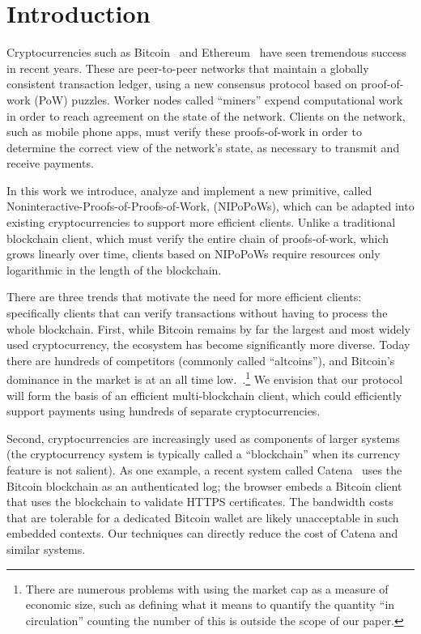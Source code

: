 \section{Introduction}
Cryptocurrencies such as Bitcoin~\cite{bitcoin} and Ethereum~\cite{ethereum} have seen tremendous success in recent years.
These are peer-to-peer networks that maintain a globally consistent transaction ledger, using a new consensus protocol based on proof-of-work (PoW) puzzles. Worker nodes called ``miners'' expend computational work in order to reach agreement on the state of the network.
Clients on the network, such as mobile phone apps, must verify these proofs-of-work in order to determine the correct view of the network's state, as necessary to transmit and receive payments.

In this work we introduce, analyze and implement  a new primitive, called Noninteractive-Proofs-of-Proofs-of-Work, (NIPoPoWs), which can be adapted into existing cryptocurrencies to support more efficient clients.
Unlike a traditional blockchain client, which must verify the entire chain of proofs-of-work, which grows linearly over time, clients based on NIPoPoWs require resources only logarithmic in the length of the blockchain.

There are three trends that motivate the need for more efficient clients: specifically clients that can verify transactions without having to process the whole blockchain.
First, while Bitcoin remains by far the largest and most widely used cryptocurrency, the ecosystem has become significantly more diverse. Today there are hundreds of competitors (commonly called ``altcoins''), and Bitcoin's dominance in the market is at an all time low.~\cite{marketcap}.\footnote{There are numerous problems with using the market cap as a measure of economic size, such as defining what it means to quantify the quantity ``in circulation'' counting the number of this is outside the scope of our paper.}
  We envision that our protocol will form the basis of an efficient multi-blockchain client, which could efficiently support payments using hundreds of separate cryptocurrencies.

  Second, cryptocurrencies are increasingly used as components of larger systems (the cryptocurrency system is typically called a ``blockchain'' when its currency feature is not salient).
  As one example, a recent system called Catena~\cite{catena} uses the Bitcoin blockchain as an authenticated log; the browser embeds a Bitcoin client that uses the blockchain to validate HTTPS certificates.
  The bandwidth costs that are tolerable for a dedicated Bitcoin wallet are likely unacceptable in such embedded contexts. Our techniques can directly reduce the cost of Catena and similar systems.

